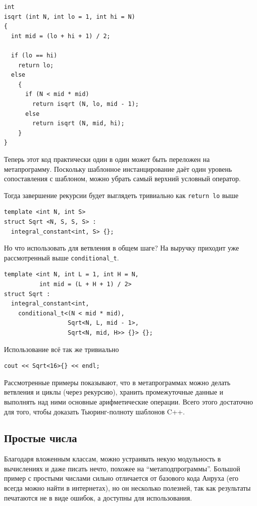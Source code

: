 \documentclass[a4paper,12pt,oneside]{book}
\begin{document}
\begin{lstlisting}
int
isqrt (int N, int lo = 1, int hi = N)
{
  int mid = (lo + hi + 1) / 2;

  if (lo == hi)
    return lo;
  else
    {
      if (N < mid * mid)
        return isqrt (N, lo, mid - 1);
      else
        return isqrt (N, mid, hi);
    }
}
\end{lstlisting}

Теперь этот код практически один в один может быть переложен на метапрограмму. Поскольку шаблонное инстанцирование даёт один уровень сопоставления с шаблоном, можно убрать самый верхний условный оператор.

Тогда завершение рекурсии будет выглядеть тривиально как \lstinline{return lo} выше

\begin{lstlisting}
template <int N, int S> 
struct Sqrt <N, S, S, S> :
  integral_constant<int, S> {};
\end{lstlisting}

Но что использовать для ветвления в общем шаге? На выручку приходит уже рассмотренный выше \lstinline!conditional_t!.

\begin{lstlisting}
template <int N, int L = 1, int H = N, 
          int mid = (L + H + 1) / 2> 
struct Sqrt :
  integral_constant<int, 
    conditional_t<(N < mid * mid), 
                  Sqrt<N, L, mid - 1>, 
                  Sqrt<N, mid, H>> {}> {};
\end{lstlisting}

Использование всё так же тривиально

\begin{lstlisting}
cout << Sqrt<16>{} << endl;
\end{lstlisting}

Рассмотренные примеры показывают, что в метапрограммах можно делать ветвления и циклы (через рекурсию), хранить промежуточные данные и выполнять над ними основные арифметические операции. Всего этого достаточно для того, чтобы доказать Тьюринг-полноту шаблонов C++.

\subsection{Простые числа}\label{TemplatePrimes}

Благодаря вложенным классам, можно устраивать некую модульность в вычислениях и даже писать нечто, похожее на ``метаподпрограммы''. Большой пример с простыми числами сильно отличается от базового кода Анруха (его всегда можно найти в интернетах), но он несколько полезней, так как результаты печатаются не в виде ошибок, а доступны для использования.
\end{document}
